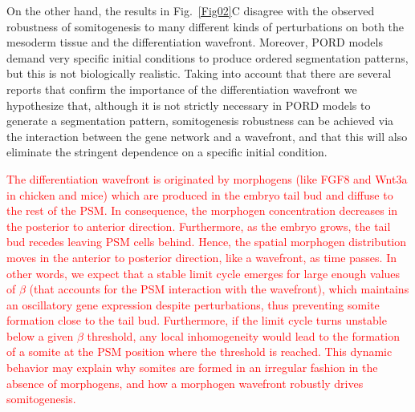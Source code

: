 \documentclass[%
 preprint,
 aip, 
 amsmath,amssymb,
]{revtex4-2}
\begin{document}
	On the other hand, the results in Fig.~\ref{Fig02}C disagree with the observed 
	robustness of somitogenesis to many different kinds of perturbations on both the 
	mesoderm tissue and the differentiation wavefront. Moreover, PORD models demand very 
	specific initial conditions to produce ordered segmentation patterns, but this is not 
	biologically realistic. Taking into account that there are several reports that confirm 
	the importance of the differentiation wavefront \cite{Naiche2011, Sawada2001} we 
	hypothesize that, although it is not strictly necessary in PORD models to generate 
	a segmentation pattern, somitogenesis robustness can be achieved via the interaction
	between the gene network and a wavefront, and that this will also eliminate 
	the stringent dependence on a specific initial condition. 
	
	\textcolor{red}{The differentiation wavefront is originated by 
	morphogens (like FGF8 and Wnt3a in chicken and mice) which are produced in the
	embryo tail bud and diffuse to the rest of the PSM. In consequence, the morphogen
	concentration decreases in the posterior to anterior direction. Furthermore, 
	as the embryo grows, the tail bud recedes leaving PSM cells behind. Hence,
	the spatial morphogen distribution moves in the anterior to posterior direction, like
	a wavefront, as time passes. In other words, we expect that a stable limit cycle 
	emerges for large
	enough values of $\beta$ (that accounts for the PSM interaction with the
	wavefront), which maintains an oscillatory gene expression despite perturbations, 
	thus preventing somite formation close to the tail bud. Furthermore, if the limit
	cycle turns unstable below a given $\beta$ threshold, any local inhomogeneity would
	lead to the formation of a somite at the PSM position where the threshold is
	reached. This dynamic behavior may explain why somites are formed in an
	irregular fashion in the absence of morphogens, and how a morphogen wavefront robustly
	drives somitogenesis.}
	
\end{document}
